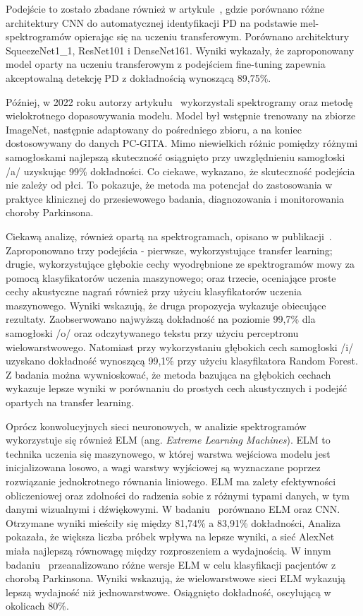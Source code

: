 Podejście to zostało zbadane również w artykule~\cite{KARAMAN2021115013}, gdzie  porównano różne architektury CNN do automatycznej identyfikacji PD na podstawie mel-spektrogramów opierając się na uczeniu transferowym.
Porównano architektury SqueezeNet1\_1, ResNet101 i DenseNet161.
Wyniki wykazały, że zaproponowany model oparty na uczeniu transferowym z podejściem fine-tuning zapewnia akceptowalną detekcję PD z dokładnością wynoszącą 89,75\%.


Później, w 2022 roku autorzy artykułu~\cite{HIRES2022105021} wykorzystali spektrogramy oraz metodę wielokrotnego dopasowywania modelu.
Model był wstępnie trenowany na zbiorze ImageNet, następnie adaptowany do pośredniego zbioru, a na koniec dostosowywany do danych PC-GITA\@.
Mimo niewielkich różnic pomiędzy różnymi samogłoskami najlepszą skuteczność osiągnięto przy uwzględnieniu samogłoski /a/ uzyskując 99\% dokładności.
Co ciekawe, wykazano, że skuteczność podejścia nie zależy od płci.
To pokazuje, że metoda ma potencjał do zastosowania w praktyce klinicznej do przesiewowego badania, diagnozowania i monitorowania choroby Parkinsona.

Ciekawą analizę, również opartą na spektrogramach, opisano w publikacji~\cite{8999815}.
Zaproponowano trzy podejścia - pierwsze, wykorzystujące transfer learning; drugie, wykorzystujące głębokie cechy wyodrębnione ze
spektrogramów mowy za pomocą klasyfikatorów uczenia maszynowego; oraz trzecie, oceniające
proste cechy akustyczne nagrań również przy użyciu klasyfikatorów uczenia maszynowego.
Wyniki wskazują, że druga propozycja wykazuje obiecujące rezultaty.
Zaobserwowano najwyższą dokładność na poziomie 99,7\% dla samogłoski /o/ oraz odczytywanego tekstu przy użyciu perceptronu wielowarstwowego.
Natomiast przy wykorzystaniu głębokich cech samogłoski /i/ uzyskano dokładność wynoszącą 99,1\% przy użyciu klasyfikatora Random Forest.
Z badania można wywnioskować, że metoda bazująca na głębokich cechach wykazuje lepsze wyniki w porównaniu do prostych cech akustycznych i
podejść opartych na transfer learning.

Oprócz konwolucyjnych sieci neuronowych, w analizie spektrogramów wykorzystuje się również ELM (ang. \emph{Extreme Learning Machines}).
ELM to technika uczenia się maszynowego, w której warstwa wejściowa modelu jest inicjalizowana losowo, a wagi warstwy wyjściowej są wyznaczane
poprzez rozwiązanie jednokrotnego równania liniowego.
ELM ma zalety efektywności obliczeniowej oraz zdolności do radzenia sobie z różnymi typami danych,
w tym danymi wizualnymi i dźwiękowymi.
W badaniu~\cite{GUATELLI2023106700} porównano ELM oraz CNN\@.
Otrzymane wyniki mieściły się między 81,74\% a 83,91\% dokładności,
Analiza pokazała, że większa liczba próbek wpływa na lepsze wyniki, a sieć AlexNet miała najlepszą równowagę między rozproszeniem a wydajnością.
W innym badaniu~\cite{Gelvez-Almeida_2022} przeanalizowano różne wersje ELM w celu klasyfikacji pacjentów z chorobą Parkinsona.
Wyniki wskazują, że wielowarstwowe sieci ELM wykazują lepszą wydajność niż jednowarstwowe.
Osiągnięto dokładność, oscylującą w okolicach 80\%.

